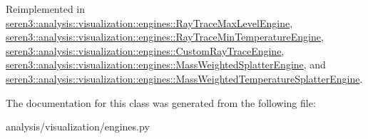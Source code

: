 Reimplemented in \hyperlink{classseren3_1_1analysis_1_1visualization_1_1engines_1_1RayTraceMaxLevelEngine_a18ccb6602ed9e6ba18cbff8de2e6ad8c}{seren3::analysis::visualization::engines::RayTraceMaxLevelEngine}, \hyperlink{classseren3_1_1analysis_1_1visualization_1_1engines_1_1RayTraceMinTemperatureEngine_aec7ecf391ca54f86f96c840f62785a8e}{seren3::analysis::visualization::engines::RayTraceMinTemperatureEngine}, \hyperlink{classseren3_1_1analysis_1_1visualization_1_1engines_1_1CustomRayTraceEngine_ac72e1e31d092afc79e0e910f9b25022d}{seren3::analysis::visualization::engines::CustomRayTraceEngine}, \hyperlink{classseren3_1_1analysis_1_1visualization_1_1engines_1_1MassWeightedSplatterEngine_ac29562a7446004938fbae70a684847c5}{seren3::analysis::visualization::engines::MassWeightedSplatterEngine}, and \hyperlink{classseren3_1_1analysis_1_1visualization_1_1engines_1_1MassWeightedTemperatureSplatterEngine_ab0bf32328b5d4a70303e76f866613e46}{seren3::analysis::visualization::engines::MassWeightedTemperatureSplatterEngine}.

The documentation for this class was generated from the following file:\begin{DoxyCompactItemize}
\item 
analysis/visualization/engines.py\end{DoxyCompactItemize}
